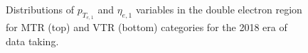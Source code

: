 \begin{figure}[htbp]
{    }
  \caption{Distributions of $p_{T_{e,1}}$ and $\eta_{e,1}$ variables in the double electron region for MTR (top) and VTR (bottom) categories for the 2018 era of data taking.}
  \label{app:2018_Zee_1}
\end{figure}


